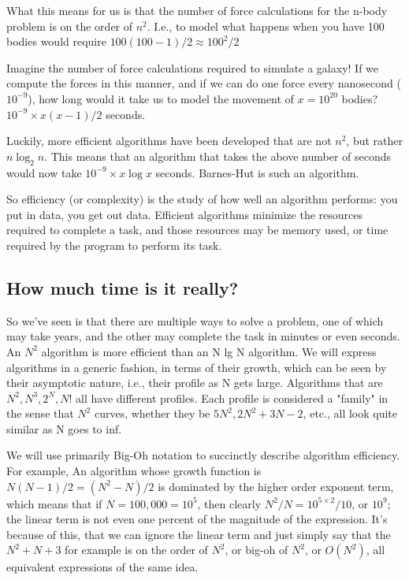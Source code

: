 \documentclass[14pt]{article} %
\begin{document}
What this means for us is that the number of force calculations for the n-body problem is on the order of $n^2$.  I.e.,
to model what happens when you have 100 bodies would require $100(100-1)/2 \approx 100^2/2$

Imagine the number of force calculations required to simulate a galaxy! If we compute the forces in this manner, and if we can do one force every nanosecond ($10^{-9}$), how long would it take us to model the movement of $x=10^{20}$ bodies?  $10^{-9} \times x(x-1)/2$ seconds.

Luckily, more efficient algorithms have been developed that are not $n^2$, but rather $n \log_2 n$.  This means that an algorithm that takes the above number of seconds would now take  $10^{-9} \times x \log x $ seconds.  Barnes-Hut is such an algorithm.

So efficiency (or complexity) is the study of how well an algorithm performs: you put in data, you get out data. Efficient algorithms minimize the resources required to complete a task, and those resources may be memory used, or time required by the program to perform its task.


\subsection{How much time is it really?}

So we've seen is that there are multiple ways to solve a problem, one of which may take years, and the other may complete the task in minutes or even seconds.  An $N^2$ algorithm is more efficient than an N lg N algorithm.  We will express algorithms in a generic fashion, in terms of their growth, which can be seen by their asymptotic nature, i.e., their profile as N gets large.  Algorithms that are $N^2, N^3, 2^N, N!$ all have different profiles.  Each profile is considered a "family" in the sense that $N^2$ curves, whether they be $5N^2, 2N^2+3N-2$, etc., all look quite similar as N goes to inf.

We will use primarily Big-Oh notation to succinctly describe algorithm efficiency.  For example, An algorithm whose growth function is $N(N-1)/2 = (N^2 - N)/2$ is dominated by the higher order exponent term, which means that if $N=100,000 = 10^5$, then clearly $N^2/N = 10^{5\times 2}/10$, or $10^9$;  the linear term is not even one percent of the magnitude of the expression.  It's because of this, that we can ignore the linear term and just simply say that the $N^2 + N + 3$ for example is on the order of $N^2$, or big-oh of $N^2$, or $O(N^2)$, all equivalent expressions of the same idea.
\end{document}
